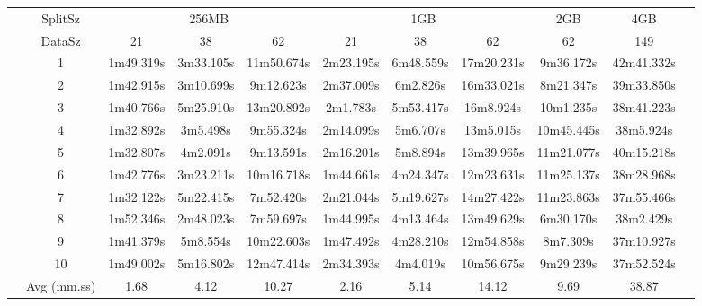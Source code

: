 \begin{tabularx}{\linewidth}{c|c|c|c|c|c|c|c|c|c|l|}
\cline{2-10}
& SplitSz 
& \multicolumn{3}{c|}{256MB} & \multicolumn{3}{c|}{1GB}  & \multicolumn{1}{c|}{2GB} & \multicolumn{1}{c|}{4GB} \\
\cline{2-10}
& DataSz 
& 21 & 38 & 62 & 21 & 38 & 62 & 62 & 149 \\
\cline{2-10}
& 1
& 1m49.319s & 3m33.105s & 11m50.674s & 2m23.195s & 6m48.559s & 17m20.231s & 9m36.172s & 42m41.332s \\
\cline{2-10}
& 2
& 1m42.915s & 3m10.699s & 9m12.623s & 2m37.009s & 6m2.826s & 16m33.021s & 8m21.347s & 39m33.850s \\
\cline{2-10}
& 3
& 1m40.766s & 5m25.910s & 13m20.892s & 2m1.783s & 5m53.417s & 16m8.924s & 10m1.235s & 38m41.223s \\
\cline{2-10}
& 4
& 1m32.892s & 3m5.498s & 9m55.324s & 2m14.099s & 5m6.707s & 13m5.015s & 10m45.445s & 38m5.924s \\
\cline{2-10}
& 5
& 1m32.807s & 4m2.091s & 9m13.591s & 2m16.201s & 5m8.894s & 13m39.965s & 11m21.077s & 40m15.218s \\
\cline{2-10}
& 6
& 1m42.776s & 3m23.211s & 10m16.718s & 1m44.661s & 4m24.347s & 12m23.631s & 11m25.137s & 38m28.968s \\
\cline{2-10}
& 7
& 1m32.122s & 5m22.415s & 7m52.420s & 2m21.044s & 5m19.627s & 14m27.422s & 11m23.863s & 37m55.466s \\
\cline{2-10}
& 8
& 1m52.346s & 2m48.023s & 7m59.697s & 1m44.995s & 4m13.464s & 13m49.629s & 6m30.170s & 38m2.429s \\
\cline{2-10}
& 9
& 1m41.379s & 5m8.554s & 10m22.603s & 1m47.492s & 4m28.210s & 12m54.858s & 8m7.309s & 37m10.927s \\
\cline{2-10}
& 10
& 1m49.002s & 5m16.802s & 12m47.414s & 2m34.393s & 4m4.019s & 10m56.675s & 9m29.239s & 37m52.524s \\
\cline{2-10}
& Avg (mm.ss)
& 1.68 & 4.12 & 10.27 & 2.16 & 5.14 & 14.12 & 9.69 & 38.87 \\
\cline{2-10}
\end{tabularx}
